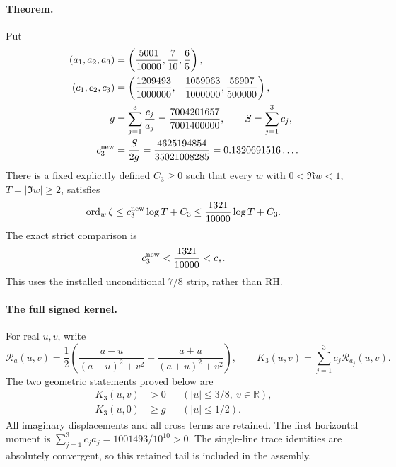 \paragraph{Theorem.}
Put
\begin{align*}
 (a_1,a_2,a_3)&=\left(\frac{5001}{10000},\frac7{10},\frac65\right),\\
 (c_1,c_2,c_3)&=\left(\frac{1209493}{1000000},
             -\frac{1059063}{1000000},\frac{56907}{500000}\right),\\
 g&=\sum_{j=1}^3\frac{c_j}{a_j}
       =\frac{7004201657}{7001400000},\qquad S=\sum_{j=1}^3c_j,\\
 c_3^{\rm new}&=\frac{S}{2g}
       =\frac{4625194854}{35021008285}
       =0.1320691516\ldots.
\end{align*}
There is a fixed explicitly defined \(C_3\ge0\) such that every
\(w\) with \(0<\Re w<1\), \(T=|\Im w|\ge2\), satisfies
\begin{equation}\label{eq:three-line-global-multiplicity}
 \operatorname{ord}_w\zeta
       \le c_3^{\rm new}\log T+C_3
       \le\frac{1321}{10000}\log T+C_3.
\end{equation}
The exact strict comparison is
\[
 c_3^{\rm new}<\frac{1321}{10000}<c_*.
\]
This uses the installed unconditional \(7/8\) strip, rather than RH.

\paragraph{The full signed kernel.}
For real \(u,v\), write
\[
 \mathcal R_a(u,v)=\frac12\left(
 \frac{a-u}{(a-u)^2+v^2}+\frac{a+u}{(a+u)^2+v^2}\right),\qquad
 K_3(u,v)=\sum_{j=1}^3 c_j\mathcal R_{a_j}(u,v).
\]
The two geometric statements proved below are
\begin{align}
 K_3(u,v)&>0&&(|u|\le3/8,\ v\in\mathbb R),\label{eq:three-line-positive}\\
 K_3(u,0)&\ge g&&(|u|\le1/2).\label{eq:three-line-charge}
\end{align}
All imaginary displacements and all cross terms are retained. The first
horizontal moment is \(\sum_{j=1}^3c_ja_j=1001493/10^{10}>0\).
The single-line trace identities are absolutely convergent, so this
retained tail is included in the assembly.

